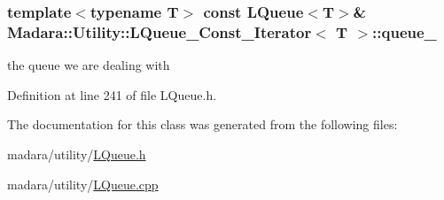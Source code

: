 \hypertarget{classMadara_1_1Utility_1_1LQueue__Const__Iterator_a599069946aa94096a5822796e12d283e}{
\subsubsection[{queue\_\-}]{\setlength{\rightskip}{0pt plus 5cm}template$<$typename T$>$ const {\bf LQueue}$<$T$>$\& {\bf Madara::Utility::LQueue\_\-Const\_\-Iterator}$<$ T $>$::{\bf queue\_\-}}}
\label{d3/db7/classMadara_1_1Utility_1_1LQueue__Const__Iterator_a599069946aa94096a5822796e12d283e}


the queue we are dealing with 



Definition at line 241 of file LQueue.h.



The documentation for this class was generated from the following files:\begin{DoxyCompactItemize}
\item 
madara/utility/\hyperlink{LQueue_8h}{LQueue.h}\item 
madara/utility/\hyperlink{LQueue_8cpp}{LQueue.cpp}\end{DoxyCompactItemize}
